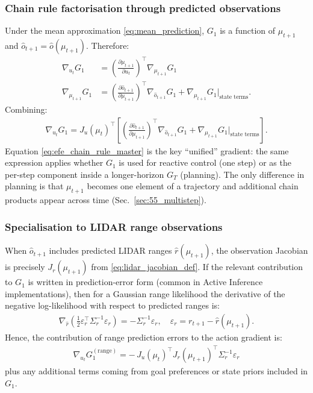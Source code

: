 \documentclass[a4paper, twoside]{article}
\begin{document}
\subsubsection{Chain rule factorisation through predicted observations}
Under the mean approximation \eqref{eq:mean_prediction}, $G_1$ is a function of $\mu_{t+1}$ and $\hat o_{t+1}=\hat o(\mu_{t+1})$. Therefore:
\begin{align}
\nabla_{u_t} G_1
&=
\left(\frac{\partial \mu_{t+1}}{\partial u_t}\right)^\top
\nabla_{\mu_{t+1}} G_1
\label{eq:dG_du_first}\\
\nabla_{\mu_{t+1}} G_1
&=
\left(\frac{\partial \hat o_{t+1}}{\partial \mu_{t+1}}\right)^\top
\nabla_{\hat o_{t+1}} G_1
+
\nabla_{\mu_{t+1}} G_1\Big|_{\text{state terms}}.
\label{eq:dG_dmu_decomp}
\end{align}
Combining:
\begin{align}
\boxed{
\nabla_{u_t} G_1
=
J_u(\mu_t)^\top
\left[
\left(\frac{\partial \hat o_{t+1}}{\partial \mu_{t+1}}\right)^\top
\nabla_{\hat o_{t+1}} G_1
+
\nabla_{\mu_{t+1}} G_1\Big|_{\text{state terms}}
\right].
}
\label{eq:efe_chain_rule_master}
\end{align}
Equation \eqref{eq:efe_chain_rule_master} is the key ``unified'' gradient: the same expression applies whether $G_1$ is used for reactive control (one step) or as the per-step component inside a longer-horizon $G_T$ (planning). The only difference in planning is that $\mu_{t+1}$ becomes one element of a trajectory and additional chain products appear across time (Sec.~\ref{sec:55_multistep}).

\subsubsection{Specialisation to LIDAR range observations}
When $\hat o_{t+1}$ includes predicted LIDAR ranges $\hat r(\mu_{t+1})$, the observation Jacobian is precisely $J_r(\mu_{t+1})$ from \eqref{eq:lidar_jacobian_def}. If the relevant contribution to $G_1$ is written in prediction-error form (common in Active Inference implementations), then for a Gaussian range likelihood the derivative of the negative log-likelihood with respect to predicted ranges is:
\begin{align}
\nabla_{\hat r} \left( \tfrac12 \varepsilon_r^\top \Sigma_r^{-1}\varepsilon_r \right)
=
-\Sigma_r^{-1}\varepsilon_r,
\quad
\varepsilon_r = r_{t+1} - \hat r(\mu_{t+1}).
\label{eq:grad_range_nll}
\end{align}
Hence, the contribution of range prediction errors to the action gradient is:
\begin{align}
\boxed{
\nabla_{u_t} G_1^{(\text{range})}
=
-\,J_u(\mu_t)^\top
J_r(\mu_{t+1})^\top
\Sigma_r^{-1}\varepsilon_r
}
\label{eq:efe_range_action_gradient}
\end{align}
plus any additional terms coming from goal preferences or state priors included in $G_1$.
\end{document}
